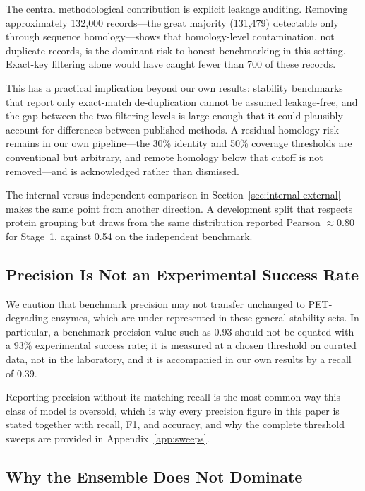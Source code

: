 \documentclass[journal,article,submit,moreauthors]{Definitions/mdpi}
\begin{document}
The central methodological contribution is explicit leakage auditing. Removing
approximately 132{,}000 records---the great majority (131{,}479) detectable only through
sequence homology---shows that homology-level contamination, not duplicate records, is the
dominant risk to honest benchmarking in this setting. Exact-key filtering alone would have
caught fewer than 700 of these records.

This has a practical implication beyond our own results: stability benchmarks that report
only exact-match de-duplication cannot be assumed leakage-free, and the gap between the two
filtering levels is large enough that it could plausibly account for differences between
published methods. A residual homology risk remains in our own pipeline---the 30\% identity
and 50\% coverage thresholds are conventional but arbitrary, and remote homology below that
cutoff is not removed---and is acknowledged rather than dismissed.

The internal-versus-independent comparison in Section~\ref{sec:internal-external} makes the
same point from another direction. A development split that respects protein grouping but
draws from the same distribution reported Pearson $\approx$0.80 for Stage~1, against 0.54
on the independent benchmark.

\subsection{Precision Is Not an Experimental Success Rate}

We caution that benchmark precision may not transfer unchanged to PET-degrading enzymes,
which are under-represented in these general stability sets. In particular, a benchmark
precision value such as 0.93 should not be equated with a 93\% experimental success rate; it
is measured at a chosen threshold on curated data, not in the laboratory, and it is
accompanied in our own results by a recall of 0.39.

Reporting precision without its matching recall is the most common way this class of model
is oversold, which is why every precision figure in this paper is stated together with
recall, F1, and accuracy, and why the complete threshold sweeps are provided in
Appendix~\ref{app:sweeps}.

\subsection{Why the Ensemble Does Not Dominate}
\end{document}
